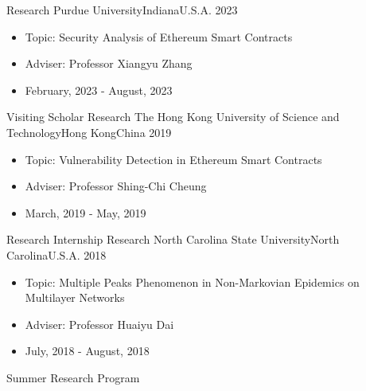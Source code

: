 %
%
%
\begin{experiences}
	\experience
	{Research} {Purdue University}{Indiana}{U.S.A.}
	{2023}    {
		\begin{itemize}
			\item Topic: Security Analysis of Ethereum Smart Contracts
			\item Adviser: Professor Xiangyu Zhang
			\item February, 2023 - August, 2023
		\end{itemize}
	}
	{Visiting Scholar}
	\emptySeparator
	\experience
	{Research} {The Hong Kong University of Science and Technology}{Hong Kong}{China}
	{2019}    {
		\begin{itemize}
			\item Topic: Vulnerability Detection in Ethereum Smart Contracts
			\item Adviser: Professor Shing-Chi Cheung
			\item March, 2019 - May, 2019
		\end{itemize}
	}
	{Research Internship}
	\emptySeparator
	\experience
	{Research}   {North Carolina State University}{North Carolina}{U.S.A.}
	{2018} {
		\begin{itemize}
			\item Topic: Multiple Peaks Phenomenon in Non-Markovian Epidemics on Multilayer Networks
			\item Adviser: Professor Huaiyu Dai
			\item July, 2018 - August, 2018
		\end{itemize}
	}
	{Summer Research Program}
\end{experiences}

